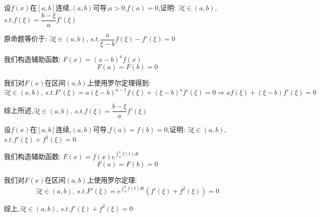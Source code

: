 
\begin{proposition}
	设$f(x)$在$[a,b]$连续,$(a,b)$可导,$a>0$,$f(a)=0$,证明: $\exists \xi\in(a,b)$, $s.t. f(\xi)=\dfrac{b-\xi}{a}f'(\xi)$
\end{proposition}
\begin{solution}

	原命题等价于: $\exists \xi\in(a,b)$, $s.t. \dfrac{a}{\xi-b}f(\xi)-f'(\xi)=0$

	我们构造辅助函数: $F(x)=(x-b)^af(x)$
	$$F(a)=F(b)=0$$

	我们对$F(x)$在区间$(a,b)$上使用罗尔定理得到:
	$$\exists \xi\in(a,b),\ s.t. F'(\xi)= a(\xi-b)^{a-1}f(\xi)+(\xi-b)^a f'(\xi)=0\Rightarrow af(\xi)+(\xi-b) f'(\xi)=0$$

	综上所述,$\exists \xi\in(a,b),\ s.t. f(\xi)=\dfrac{b-\xi}{a}f'(\xi)$
\end{solution}


\begin{proposition}
	设$f(x)$在$[a,b]$连续,$(a,b)$可导,$f(a)=f(b)=0$,证明: $\exists \xi\in(a,b)$, $s.t. f'(\xi)+f^{2}(\xi)=0$
\end{proposition}
\begin{solution}

	我们构造辅助函数: $F(x)=f(x)e^{\int_{a}^{x}f(t)dt}$
	$$F(a)=F(b)=0$$

	我们对$F(x)$在区间$(a,b)$上使用罗尔定理:
	$$\exists \xi\in(a,b),\ s.t. F'(\xi)=e^{\int_{a}^{\xi}f(t)dt}(f'(\xi)+f^2(\xi))=0$$

	综上,$\exists \xi\in(a,b)$, $s.t. f'(\xi)+f^{2}(\xi)=0$
\end{solution}


